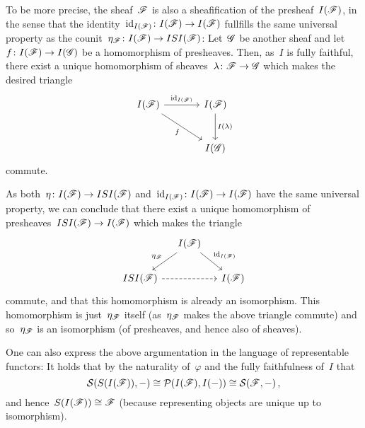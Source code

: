 \begin{example}
\begin{enumerate}
      To be more precise, the sheaf~$\mathscr{F}$ is also a sheafification of the presheaf~$I(\mathscr{F})$, in the sense that the identity~$\operatorname{id}_{I(\mathscr{F})} \colon I(\mathscr{F}) \to I(\mathscr{F})$ fullfills the same universal property as the counit~$\eta_{\mathscr{F}} \colon I(\mathscr{F}) \to ISI(\mathscr{F})$:
      Let~$\mathscr{G}$ be another sheaf and let~$f \colon I(\mathscr{F}) \to I(\mathscr{G})$ be a homomorphism of presheaves.
      Then, as~$I$ is fully faithful, there exist a unique homomorphism of sheaves~$\lambda \colon \mathscr{F} \to \mathscr{G}$ which makes the desired triangle
      \[
        \begin{tikzcd}[sep = large]
            I(\sheaf{F})
            \arrow{r}[above]{\id_{I(\sheaf{F})}}
            \arrow{dr}[below left]{f}
          & I(\sheaf{F})
            \arrow{d}[right]{I(\lambda)}
          \\
            {}
          & I(\sheaf{G})
        \end{tikzcd}
      \]
      commute.
      
      As both~$\eta \colon I(\mathscr{F}) \to ISI(\mathscr{F})$ and~$\operatorname{id}_{I(\mathscr{F})} \colon I(\mathscr{F}) \to I(\mathscr{F})$ have the same universal property, we can conclude that there exist a unique homomorphism of presheaves~$ISI(\mathscr{F}) \to I(\mathscr{F})$ which makes the triangle
      \[
        \begin{tikzcd}[column sep = small]
            {}
          & I(\sheaf{F})
            \arrow{dl}[above left]{\eta_{\sheaf{F}}}
            \arrow{dr}[above right]{\id_{I(\sheaf{F})}}
          & {}
          \\
            ISI(\sheaf{F})
            \arrow[dashed]{rr}
          & {}
          & I(\sheaf{F})
        \end{tikzcd}
      \]
      commute, and that this homomorphism is already an isomorphism.
      This homomorphism is just~$\eta_{\mathscr{F}}$ itself (as~$\eta_{\mathscr{F}}$ makes the above triangle commute) and so~$\eta_{\mathscr{F}}$ is an isomorphism (of presheaves, and hence also of sheaves).
      
      \begin{remark*}
        One can also express the above argumentation in the language of representable functors:
        It holds that by the naturality of~$\varphi$ and the fully faithfulness of~$I$ that
        \[
                \mathcal{S}(S(I(\mathscr{F})), -)
          \cong \mathcal{P}(I(\mathscr{F}), I(-))
          \cong \mathcal{S}(\mathscr{F}, -) \,,
        \]
        and hence~$S(I(\mathscr{F})) \cong \mathscr{F}$ (because representing objects are unique up to isomorphism).
      \end{remark*}
      

\end{enumerate}
\end{example}
